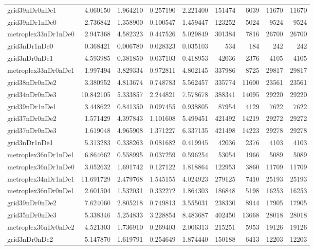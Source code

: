 \begin{longtable}{|l|r|r|r|r|r|r|r|r|}
grid39nDr0nDe1 & 4.060150 & 1.964210 & 0.257190 & 2.221400 & 151474 & 6039 & 11670 & 11670 \\
grid39nDr1nDe0 & 2.736842 & 1.358900 & 0.100547 & 1.459447 & 123252 & 5024 & 9524 & 9524 \\
metroplex33nDr1nDe0 & 2.947368 & 4.582323 & 0.447526 & 5.029849 & 301384 & 7816 & 26700 & 26700 \\
grid3nDr1nDe0 & 0.368421 & 0.006780 & 0.028323 & 0.035103 & 534 & 184 & 242 & 242 \\
grid3nDr0nDe1 & 4.593985 & 0.381850 & 0.037103 & 0.418953 & 42036 & 2376 & 4105 & 4105 \\
metroplex33nDr0nDe1 & 1.997494 & 3.829334 & 0.972811 & 4.802145 & 337986 & 8725 & 29817 & 29817 \\
grid38nDr0nDe2 & 3.380952 & 4.813674 & 0.748783 & 5.562457 & 335774 & 11600 & 23561 & 23561 \\
grid34nDr0nDe3 & 10.842105 & 5.333857 & 2.244821 & 7.578678 & 388341 & 14095 & 29220 & 29220 \\
grid39nDr1nDe1 & 3.448622 & 0.841350 & 0.097455 & 0.938805 & 87954 & 4129 & 7622 & 7622 \\
grid37nDr0nDe2 & 1.571429 & 4.397843 & 1.101608 & 5.499451 & 421492 & 14219 & 29272 & 29272 \\
grid37nDr0nDe3 & 1.619048 & 4.965908 & 1.371227 & 6.337135 & 421498 & 14223 & 29278 & 29278 \\
grid3nDr1nDe1 & 5.313283 & 0.338263 & 0.081682 & 0.419945 & 42036 & 2376 & 4103 & 4103 \\
metroplex36nDr1nDe1 & 6.864662 & 0.558995 & 0.037259 & 0.596254 & 53054 & 1966 & 5089 & 5089 \\
metroplex36nDr1nDe0 & 3.052632 & 1.691742 & 0.127122 & 1.818864 & 122953 & 3860 & 11709 & 11709 \\
metroplex34nDr1nDe1 & 11.691729 & 2.479768 & 1.545155 & 4.024923 & 279125 & 7410 & 25193 & 25193 \\
metroplex36nDr0nDe1 & 2.601504 & 1.532031 & 0.332272 & 1.864303 & 186848 & 5198 & 16253 & 16253 \\
grid39nDr0nDe2 & 7.624060 & 2.805218 & 0.749813 & 3.555031 & 238330 & 8944 & 17905 & 17905 \\
grid35nDr0nDe3 & 5.338346 & 5.254833 & 3.228854 & 8.483687 & 402450 & 13668 & 28018 & 28018 \\
metroplex36nDr0nDe2 & 4.521303 & 1.736910 & 0.269403 & 2.006313 & 215251 & 5953 & 19126 & 19126 \\
grid3nDr0nDe2 & 5.147870 & 1.619791 & 0.254649 & 1.874440 & 150188 & 6413 & 12203 & 12203 \\

\end{longtable}
